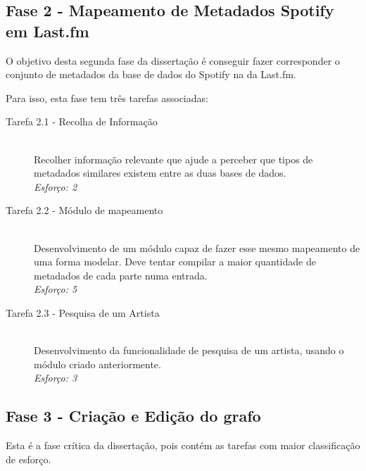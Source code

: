
  \subsection{Fase 2 - Mapeamento de Metadados Spotify em Last.fm} %
  \label{sub:dev_mapeamento}

    O objetivo desta segunda fase da dissertação é conseguir fazer corresponder o conjunto de metadados da base de dados do Spotify na da Last.fm.
    
    Para isso, esta fase tem três tarefas associadas:
    \begin{description}
      \item[Tarefa 2.1 - Recolha de Informação] \hfill \\
        Recolher informação relevante que ajude a perceber que tipos de metadados similares existem entre as duas bases de dados. \\
        \emph{Esforço: 2}

      \item[Tarefa 2.2 - Módulo de mapeamento] \hfill \\
        Desenvolvimento de um módulo capaz de fazer esse mesmo mapeamento de uma forma modelar.
        Deve tentar compilar a maior quantidade de metadados de cada parte numa entrada.\\
        \emph{Esforço: 5}

      \item[Tarefa 2.3 - Pesquisa de um Artista] \hfill \\
        Desenvolvimento da funcionalidade de pesquisa de um artista, usando o módulo criado anteriormente. \\
        \emph{Esforço: 3}

    \end{description}


  \subsection{Fase 3 - Criação e Edição do grafo} %
  \label{sub:dev_grafo}
  
    Esta é a fase crítica da dissertação, pois contém as tarefas com maior classificação de esforço.

